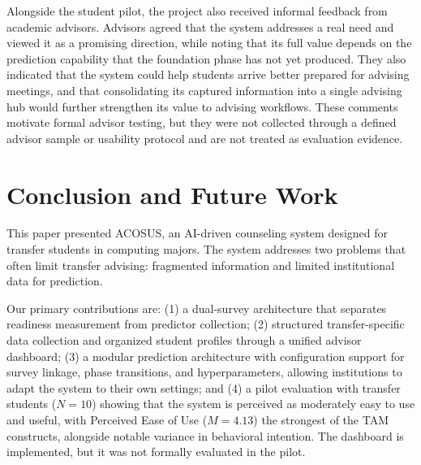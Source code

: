\documentclass[letterpaper,11pt]{article}
\begin{document}
Alongside the student pilot, the project also received informal feedback from academic advisors. Advisors agreed that the system addresses a real need and viewed it as a promising direction, while noting that its full value depends on the prediction capability that the foundation phase has not yet produced. They also indicated that the system could help students arrive better prepared for advising meetings, and that consolidating its captured information into a single advising hub would further strengthen its value to advising workflows. These comments motivate formal advisor testing, but they were not collected through a defined advisor sample or usability protocol and are not treated as evaluation evidence.

%
%

\section{Conclusion and Future Work}\label{sec:conclusion}

This paper presented ACOSUS, an AI-driven counseling system designed for transfer students in computing majors. The system addresses two problems that often limit transfer advising: fragmented information and limited institutional data for prediction.

Our primary contributions are: (1) a dual-survey architecture that separates readiness measurement from predictor collection; (2) structured transfer-specific data collection and organized student profiles through a unified advisor dashboard; (3) a modular prediction architecture with configuration support for survey linkage, phase transitions, and hyperparameters, allowing institutions to adapt the system to their own settings; and (4) a pilot evaluation with transfer students ($N=10$) showing that the system is perceived as moderately easy to use and useful, with Perceived Ease of Use ($M=4.13$) the strongest of the TAM constructs, alongside notable variance in behavioral intention. The dashboard is implemented, but it was not formally evaluated in the pilot.
\end{document}
